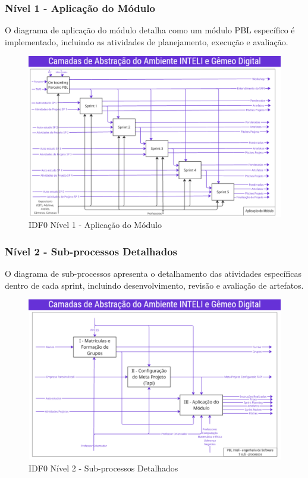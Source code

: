 \documentclass[english, spanish, brazilian]{RBIEarticle} %
\begin{document}
\subsubsection{Nível 1 - Aplicação do Módulo}

O diagrama de aplicação do módulo detalha como um módulo PBL específico é implementado, incluindo as atividades de planejamento, execução e avaliação.

\begin{figure}[h]
	\centerline{\includegraphics[scale=0.5]{assets/idf0_aplicação_módulo.png}}
	\caption{IDF0 Nível 1 - Aplicação do Módulo}
	\label{fig:idf0_nivel1}
\end{figure}

\subsubsection{Nível 2 - Sub-processos Detalhados}

O diagrama de sub-processos apresenta o detalhamento das atividades específicas dentro de cada sprint, incluindo desenvolvimento, revisão e avaliação de artefatos.

\begin{figure}[h]
	\centerline{\includegraphics[scale=0.5]{assets/idf0_camada_3_sub_processos.png}}
	\caption{IDF0 Nível 2 - Sub-processos Detalhados}
	\label{fig:idf0_nivel2}
\end{figure}
\end{document}
